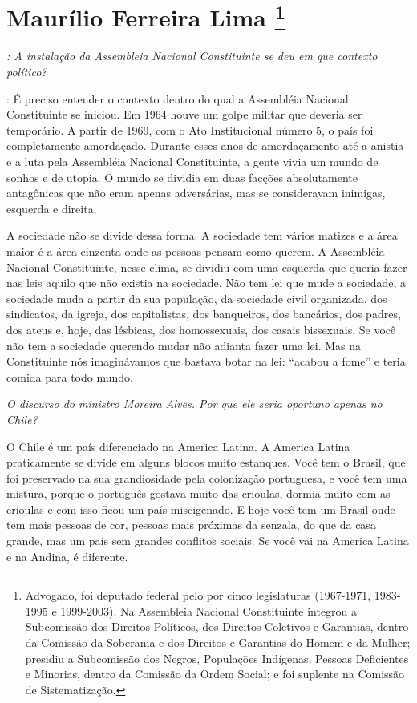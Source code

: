 \chapter{Maurílio Ferreira Lima
\footnote{Advogado, foi deputado federal pelo  por cinco legislaturas
(1967-1971, 1983-1995 e 1999-2003). Na Assembleia Nacional Constituinte
integrou a Subcomissão dos Direitos Políticos, dos Direitos Coletivos e
Garantias, dentro da Comissão da Soberania e dos Direitos e Garantias do
Homem e da Mulher; presidiu a Subcomissão dos Negros, Populações
Indígenas, Pessoas Deficientes e Minorias, dentro da Comissão da Ordem
Social; e foi suplente na Comissão de Sistematização.}}

\emph{: A instalação da Assembleia Nacional Constituinte se deu em que
contexto político?}

: É preciso entender o contexto dentro do qual a
Assembléia Nacional Constituinte se iniciou. Em 1964 houve um golpe
militar que deveria ser temporário. A partir de 1969, com o Ato
Institucional número 5, o país foi completamente amordaçado. Durante
esses anos de amordaçamento até a anistia e a luta pela Assembléia
Nacional Constituinte, a gente vivia um mundo de sonhos e de utopia. O
mundo se dividia em duas facções absolutamente antagônicas que não eram
apenas adversárias, mas se consideravam inimigas, esquerda e direita.

A sociedade não se divide dessa forma. A sociedade tem vários matizes e
a área maior é a área cinzenta onde as pessoas pensam como querem. A
Assembléia Nacional Constituinte, nesse clima, se dividiu com uma
esquerda que queria fazer nas leis aquilo que não existia na sociedade.
Não tem lei que mude a sociedade, a sociedade muda a partir da sua
população, da sociedade civil organizada, dos sindicatos, da igreja, dos
capitalistas, dos banqueiros, dos bancários, dos padres, dos ateus e,
hoje, das lésbicas, dos homossexuais, dos casais bissexuais. Se você não
tem a sociedade querendo mudar não adianta fazer uma lei. Mas na
Constituinte nós imaginávamos que bastava botar na lei: ``acabou a
fome'' e teria comida para todo mundo.

\medskip

\emph{O discurso do ministro Moreira Alves. Por que ele seria oportuno
apenas no Chile?}

O Chile é um país diferenciado na America Latina. A
America Latina praticamente se divide em alguns blocos muito estanques.
Você tem o Brasil, que foi preservado na sua grandiosidade pela
colonização portuguesa, e você tem uma mistura, porque o português
gostava muito das crioulas, dormia muito com as crioulas e com isso
ficou um país miscigenado. E hoje você tem um Brasil onde tem mais
pessoas de cor, pessoas mais próximas da senzala, do que da casa grande,
mas um país sem grandes conflitos sociais. Se você vai na America Latina
e na Andina, é diferente.

